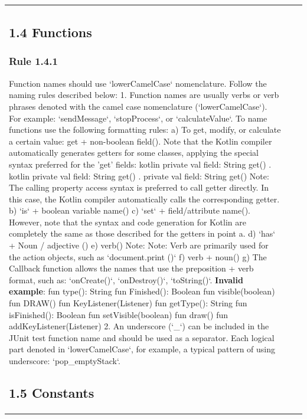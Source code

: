 \begin{center}
\begin{tabular}{ |p{}|p{}|p{}| }
\subsection*{\textbf{1.4 Functions}}
\subsubsection*{\textbf{Rule 1.4.1}}
Function names should use `lowerCamelCase` nomenclature. Follow the naming rules described below:
1.	Function names are usually verbs or verb phrases denoted with the camel case nomenclature (`lowerCamelCase`).
For example: `sendMessage`, `stopProcess`, or `calculateValue`.
To name functions use the following formatting rules:
a) To get, modify, or calculate a certain value: get + non-boolean field(). Note that the Kotlin compiler automatically generates getters for some classes, applying the special syntax preferred for the 'get' fields: kotlin private val field: String get() { }. kotlin private val field: String get() { }.
private val field: String
get() {
}
Note: The calling property access syntax is preferred to call getter directly. In this case, the Kotlin compiler automatically calls the corresponding getter.
b) `is` + boolean variable name()
c) `set` + field/attribute name(). However, note that the syntax and code generation for Kotlin are completely the same as those described for the getters in point a.
d) `has` + Noun / adjective ()
e) verb()
Note: Note: Verb are primarily used for the action objects, such as `document.print ()`
f) verb + noun()
g) The Callback function allows the names that use the preposition + verb format, such as: `onCreate()`, `onDestroy()`, `toString()`.
\textbf{Invalid example}:
fun type(): String
fun Finished(): Boolean
fun visible(boolean)
fun DRAW()
fun KeyListener(Listener)
fun getType(): String
fun isFinished(): Boolean
fun setVisible(boolean)
fun draw()
fun addKeyListener(Listener)
2.	An underscore (`_`) can be included in the JUnit test function name and should be used as a separator. Each logical part denoted in `lowerCamelCase`, for example, a typical pattern of using underscore: `pop_emptyStack`.
\subsection*{\textbf{1.5 Constants}}

\end{tabular}
\end{center}
